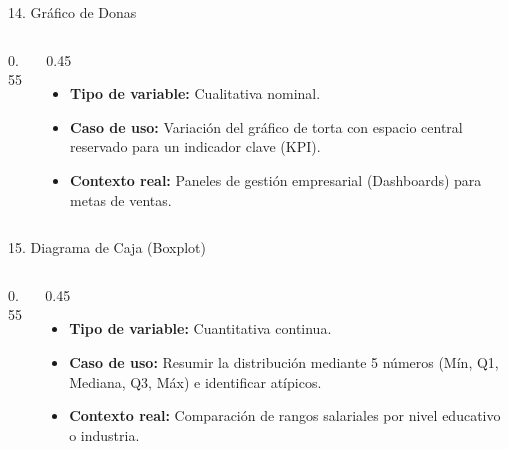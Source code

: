 \documentclass[aspectratio=169,10pt]{beamer}
\begin{document}
\begin{frame}{14. Gráfico de Donas}
\begin{columns}
\begin{column}{0.55\textwidth}
\end{column}
\begin{column}{0.45\textwidth}
\begin{itemize}\small
\item \textbf{Tipo de variable:} Cualitativa nominal.
\item \textbf{Caso de uso:} Variación del gráfico de torta con espacio central reservado para un indicador clave (KPI).
\item \textbf{Contexto real:} Paneles de gestión empresarial (Dashboards) para metas de ventas.
\end{itemize}
\end{column}
\end{columns}
\end{frame}

\begin{frame}{15. Diagrama de Caja (Boxplot)}
\begin{columns}
\begin{column}{0.55\textwidth}
\end{column}
\begin{column}{0.45\textwidth}
\begin{itemize}\small
\item \textbf{Tipo de variable:} Cuantitativa continua.
\item \textbf{Caso de uso:} Resumir la distribución mediante 5 números (Mín, Q1, Mediana, Q3, Máx) e identificar atípicos.
\item \textbf{Contexto real:} Comparación de rangos salariales por nivel educativo o industria.
\end{itemize}
\end{column}
\end{columns}
\end{frame}
\end{document}
